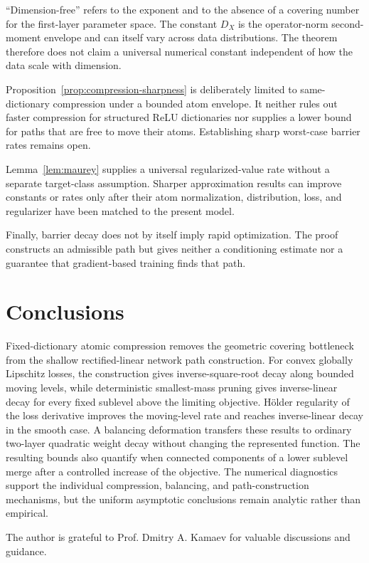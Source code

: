 \documentclass[smallextended,envcountsect]{svjour3}
\begin{document}
``Dimension-free'' refers to the exponent and to the absence of a covering
number for the first-layer parameter space.  The constant $D_X$ is the
operator-norm second-moment envelope and can itself vary across data
distributions.  The theorem therefore does not claim a universal numerical
constant independent of how the data scale with dimension.

Proposition~\ref{prop:compression-sharpness} is deliberately limited to
same-dictionary compression under a bounded atom envelope.  It neither rules
out faster compression for structured ReLU dictionaries nor supplies a lower
bound for paths that are free to move their atoms.  Establishing sharp
worst-case barrier rates remains open.

Lemma~\ref{lem:maurey} supplies a universal regularized-value rate without a
separate target-class assumption.  Sharper approximation results can improve
constants or rates only after their atom normalization, distribution, loss,
and regularizer have been matched to the present model.

Finally, barrier decay does not by itself imply rapid optimization. The proof constructs an admissible path but gives neither a conditioning estimate nor a guarantee that gradient-based training finds that path.

\section{Conclusions}\label{sec:conclusion}

Fixed-dictionary atomic compression removes the geometric covering bottleneck
from the shallow rectified-linear network path construction. For convex
globally Lipschitz losses, the construction gives inverse-square-root decay
along bounded moving levels, while deterministic smallest-mass pruning gives
inverse-linear decay for every fixed sublevel above the limiting objective.
H\"older regularity of the loss derivative improves the moving-level rate and
reaches inverse-linear decay in the smooth case. A balancing deformation
transfers these results to ordinary two-layer quadratic weight decay without
changing the represented function. The resulting bounds also quantify when
connected components of a lower sublevel merge after a controlled increase of
the objective. The numerical diagnostics support the individual compression,
balancing, and path-construction mechanisms, but the uniform asymptotic
conclusions remain analytic rather than empirical.

\begin{acknowledgements}
The author is grateful to Prof. Dmitry A. Kamaev for valuable discussions and
guidance.
\end{acknowledgements}
\end{document}
